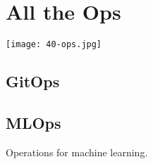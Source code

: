 \chapter{All the Ops}

\texttt{[image: 40-ops.jpg]}

\section{GitOps}



\section{MLOps}

Operations for machine learning.

